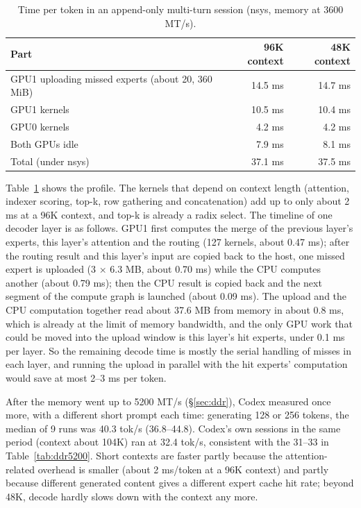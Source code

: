 \documentclass[11pt,a4paper]{article}
\newcommand{\tps}{tok/s}
\begin{document}
\begin{table}[h]
  \centering
  \small
  \caption{Time per token in an append-only multi-turn session (nsys, memory at 3600 MT/s).}
  \label{tab:realdecode}
  \begin{tabular}{@{}l r r@{}}
    \toprule
    Part & 96K context & 48K context \\
    \midrule
    GPU1 uploading missed experts (about 20, 360 MiB) & 14.5 ms & 14.7 ms \\
    GPU1 kernels & 10.5 ms & 10.4 ms \\
    GPU0 kernels & 4.2 ms & 4.2 ms \\
    Both GPUs idle & 7.9 ms & 8.1 ms \\
    Total (under nsys) & 37.1 ms & 37.5 ms \\
    \bottomrule
  \end{tabular}
\end{table}

Table~\ref{tab:realdecode} shows the profile. The kernels that depend on context length (attention, indexer scoring, top-k, row gathering and concatenation) add up to only about 2 ms at a 96K context, and top-k is already a radix select. The timeline of one decoder layer is as follows. GPU1 first computes the merge of the previous layer's experts, this layer's attention and the routing (127 kernels, about 0.47 ms); after the routing result and this layer's input are copied back to the host, one missed expert is uploaded (3 × 6.3 MB, about 0.70 ms) while the CPU computes another (about 0.79 ms); then the CPU result is copied back and the next segment of the compute graph is launched (about 0.09 ms). The upload and the CPU computation together read about 37.6 MB from memory in about 0.8 ms, which is already at the limit of memory bandwidth, and the only GPU work that could be moved into the upload window is this layer's hit experts, under 0.1 ms per layer. So the remaining decode time is mostly the serial handling of misses in each layer, and running the upload in parallel with the hit experts' computation would save at most 2--3 ms per token.

After the memory went up to 5200 MT/s (\S\ref{sec:ddr}), Codex measured once more, with a different short prompt each time: generating 128 or 256 tokens, the median of 9 runs was 40.3 \tps{} (36.8--44.8). Codex's own sessions in the same period (context about 104K) ran at 32.4 \tps{}, consistent with the 31--33 in Table~\ref{tab:ddr5200}. Short contexts are faster partly because the attention-related overhead is smaller (about 2 ms/token at a 96K context) and partly because different generated content gives a different expert cache hit rate; beyond 48K, decode hardly slows down with the context any more.
\end{document}
